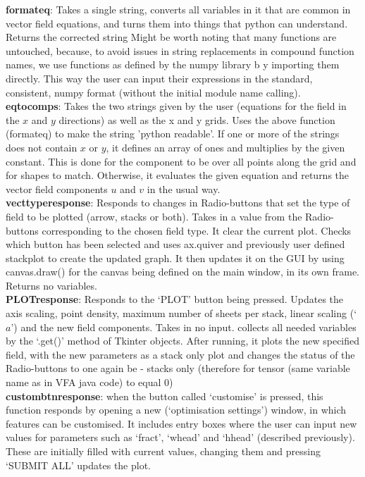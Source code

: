 \documentclass[12pt]{report}
\begin{document}
\textbf{format\textunderscore eq}: Takes a single string, converts all variables in it that are common in vector field equations, and turns them into things that python can understand. Returns the corrected string
Might be worth noting that many functions are untouched, because, to avoid issues in string replacements in compound function names, we use functions as defined by the numpy library b y importing them directly. This way the user can input their expressions in the standard, consistent, numpy format (without the initial module name calling). \\
\textbf{eq\textunderscore to\textunderscore comps}: Takes the two strings given by the user (equations for the field in the $x$ and $y$ directions) as well as the x and y grids. Uses the above function (format\textunderscore eq) to make the string 'python readable'. If one or more of the strings does not contain $x$ or $y$, it defines an array of ones and multiplies by the given constant. This is done for the component to be over all points along the grid and for shapes to match. Otherwise, it evaluates the given equation and returns the vector field components $u$ and $v$ in the usual way.\\
\textbf{vect\textunderscore type\textunderscore response}: Responds to changes in Radio-buttons that set the type of field to be plotted (arrow, stacks or both). Takes in a value from the Radio-buttons corresponding to the chosen field type. It clear the current plot. Checks which button has been selected and uses ax.quiver and previously user defined stack\textunderscore plot to create the updated graph. It then updates it on the GUI by using canvas.draw() for the canvas being defined on the main window, in its own frame. Returns no variables.\\
\textbf{PLOT\textunderscore response}: Responds to the `PLOT' button being pressed. Updates the axis scaling, point density, maximum number of sheets per stack, linear scaling (`$a$') and the new field components. Takes in no input. collects all needed variables by the `.get()' method of Tkinter objects. After running, it plots the new specified field, with the new parameters as a stack only plot and changes the status of the Radio-buttons to one again be - stacks only (therefore for tensor (same variable name as in VFA java code) to equal 0)\\
\textbf{custom\textunderscore btn\textunderscore response}: when the button called `customise' is pressed, this function responds by opening a new (`optimisation settings') window, in which features can be customised. It includes entry boxes where the user can input new values for parameters such as `fract', `w\textunderscore head' and `h\textunderscore head' (described previously). These are initially filled with current values, changing them and pressing `SUBMIT ALL' updates the plot.\\
\end{document}

